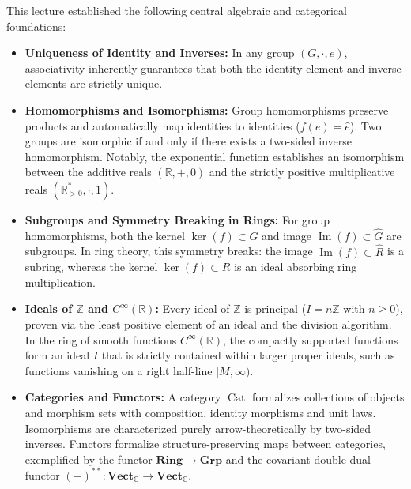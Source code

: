 \begin{overview}
This lecture established the following central algebraic and categorical foundations:
\begin{itemize}
    \item \textbf{Uniqueness of Identity and Inverses:} In any group $(G, \cdot, e)$, associativity inherently guarantees that both the identity element and inverse elements are strictly unique.
    \item \textbf{Homomorphisms and Isomorphisms:} Group homomorphisms preserve products and automatically map identities to identities ($f(e) = \hat{e}$). Two groups are isomorphic if and only if there exists a two-sided inverse homomorphism. Notably, the exponential function establishes an isomorphism between the additive reals $(\mathbb{R}, +, 0)$ and the strictly positive multiplicative reals $(\mathbb{R}^*_{>0}, \cdot, 1)$.
    \item \textbf{Subgroups and Symmetry Breaking in Rings:} For group homomorphisms, both the kernel $\operatorname{ker}(f) \subset G$ and image $\operatorname{Im}(f) \subset \hat{G}$ are subgroups. In ring theory, this symmetry breaks: the image $\operatorname{Im}(f) \subset \hat{R}$ is a subring, whereas the kernel $\operatorname{ker}(f) \subset R$ is an ideal absorbing ring multiplication.
    \item \textbf{Ideals of $\mathbb{Z}$ and $C^\infty(\mathbb{R})$:} Every ideal of $\mathbb{Z}$ is principal ($I = n\mathbb{Z}$ with $n \ge 0$), proven via the least positive element of an ideal and the division algorithm. In the ring of smooth functions $C^\infty(\mathbb{R})$, the compactly supported functions form an ideal $I$ that is strictly contained within larger proper ideals, such as functions vanishing on a right half-line $[M, \infty)$.
    \item \textbf{Categories and Functors:} A category $\operatorname{Cat}$ formalizes collections of objects and morphism sets with composition, identity morphisms and unit laws. Isomorphisms are characterized purely arrow-theoretically by two-sided inverses. Functors formalize structure-preserving maps between categories, exemplified by the functor $\mathbf{Ring} \to \mathbf{Grp}$ and the covariant double dual functor $(-)^{**} \colon \mathbf{Vect}_{\mathbb{C}} \to \mathbf{Vect}_{\mathbb{C}}$.
\end{itemize}
\end{overview}